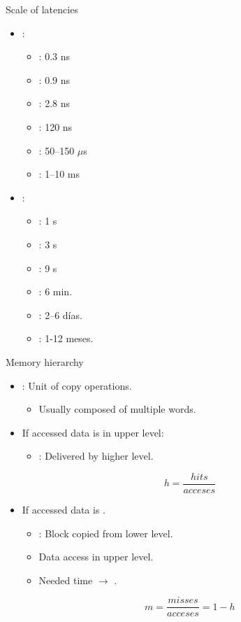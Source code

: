 \begin{frame}[t]{Scale of latencies}
\begin{itemize}
  \item {}:
    \begin{itemize}
      \item {}: 0.3 ns
      \item {}: 0.9 ns 
      \item {}: 2.8 ns 
      \item {}: 120 ns 
      \item {}: 50--150 $\mu$s 
      \item {}: 1--10 ms
    \end{itemize}

  \pause
  \item {}:
    \begin{itemize}
      \item {}: 1 s
      \item {}: 3 s
      \item {}: 9 s
      \item {}: 6 min.
      \item {}: 2--6 días.
      \item {}: 1-12 meses.
    \end{itemize}
\end{itemize}
\end{frame}

\begin{frame}[t]{Memory hierarchy}
\begin{itemize}
  \item {}: Unit of copy operations.
    \begin{itemize}
      \item Usually composed of multiple words.
    \end{itemize}

  \item If accessed data is  in upper level:
    \begin{itemize}
      \item {}: Delivered by higher level.
    \end{itemize}
\[
h = \frac{hits}{acceses}
\]

  \item If accessed data is .
    \begin{itemize}
      \item {}: Block copied from lower level.
      \item Data access in upper level.
      \item Needed time $\rightarrow$ .
    \end{itemize}
\[
m = \frac{misses}{acceses} = 1 - h
\]

\end{itemize}
\end{frame}

